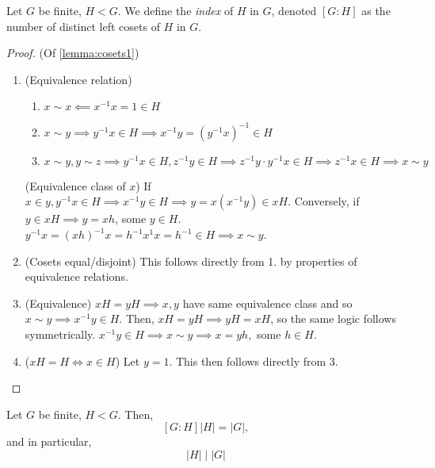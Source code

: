 \documentclass[12pt,oneside]{article}
\begin{document}
\begin{definition}
  Let $G$ be finite, $H < G$. We define the \emph{index} of $H$ in $G$, denoted $[G : H]$ as the number of distinct left cosets of $H$ in $G$.
\end{definition}

\begin{proof}(Of \cref{lemma:cosets1})
  \begin{enumerate}
    \item (Equivalence relation) 
    \begin{enumerate}
      \item $x\sim x \impliedby x^{-1}x = 1 \in H$
      \item $x \sim y \implies y^{-1}x \in H \implies x^{-1}y = (y^{-1}x)^{-1} \in H$
      \item $x \sim y, y \sim z \implies y^{-1}x \in H, z^{-1}y \in H \implies z^{-1}y\cdot y^{-1}x \in H \implies z^{-1}x \in H \implies x \sim y$
    \end{enumerate}
    (Equivalence class of $x$) If $x \in y, y^{-1}x \in H \implies x^{-1}y \in H \implies y = x (x^{-1}y) \in xH$. Conversely, if $y \in xH \implies y = xh$, some $y \in H$. $y^{-1}x = (xh)^{-1} x = h^{-1}x^{1}x = h^{-1} \in H \implies x \sim y$.
    \item (Cosets equal/disjoint) This follows directly from 1. by properties of equivalence relations.
    \item (Equivalence) $xH = yH \implies x, y$ have same equivalence class and so $x \sim y \implies x^{-1}y \in H$. Then, $xH = yH \implies yH = xH$, so the same logic follows symmetrically. $x^{-1}y \in H \implies x \sim y \implies x = y h,$ some $h \in H$.
    \item ($xH = H \iff x \in H$) Let $y = 1$. This then follows directly from 3.
  \end{enumerate}
\end{proof}

\begin{theorem}\label{thm:lagrange}
  Let $G$ be finite, $H < G$. Then,
  \[[G:H]|H| = |G|,\] and in particular, \[|H|\mid|G|\]
\end{theorem}
\end{document}
